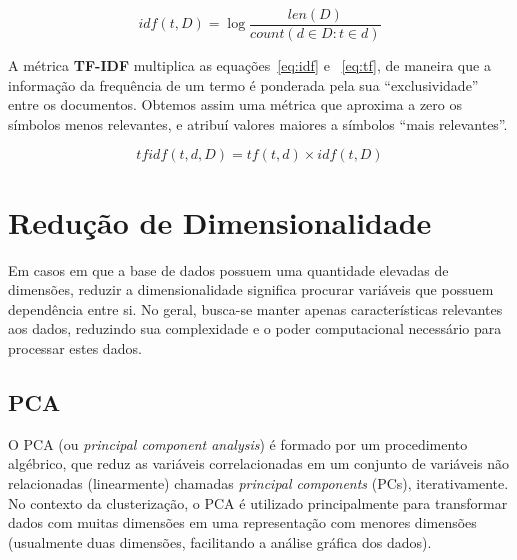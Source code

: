 \begin{equation}\label{eq:idf}
idf(t, D) = \log \frac{len(D)}{count(d \in D : t \in d)}
\end{equation}


A métrica \textbf{TF-IDF} multiplica as equações~\ref{eq:idf} e ~\ref{eq:tf}, de maneira que a informação da frequência de um termo é ponderada pela sua ``exclusividade'' entre os documentos.
Obtemos assim uma métrica que aproxima a zero os símbolos menos relevantes, e atribuí valores maiores a símbolos ``mais relevantes''.

\begin{equation}
tfidf(t, d, D) = tf(t, d) \times idf(t, D)
\end{equation}

 \section{Redução de Dimensionalidade}
 Em casos em que a base de dados possuem uma quantidade elevadas de dimensões, 
reduzir a dimensionalidade significa procurar variáveis que possuem dependência entre si.
No geral, busca-se manter apenas características relevantes aos dados, reduzindo sua complexidade e o poder computacional necessário para processar estes dados.

 \subsection{PCA}
 O PCA (ou \emph{principal component analysis}) é formado por um procedimento algébrico, 
 que reduz as variáveis correlacionadas em um conjunto de variáveis não relacionadas (linearmente) chamadas \emph{principal components} (PCs), iterativamente.
 No contexto da clusterização, o PCA é utilizado principalmente para transformar dados com muitas dimensões em uma representação com menores dimensões (usualmente duas dimensões, facilitando a análise gráfica dos dados).
 
 
